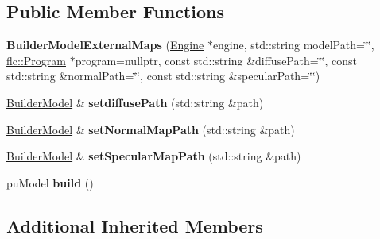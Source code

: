 \subsection*{Public Member Functions}
\begin{DoxyCompactItemize}
\item 
{\bfseries Builder\+Model\+External\+Maps} (\hyperlink{classflw_1_1Engine}{Engine} $\ast$engine, std\+::string model\+Path=\char`\"{}\char`\"{}, \hyperlink{classflw_1_1flc_1_1Program}{flc\+::\+Program} $\ast$program=nullptr, const std\+::string \&diffuse\+Path=\char`\"{}\char`\"{}, const std\+::string \&normal\+Path=\char`\"{}\char`\"{}, const std\+::string \&specular\+Path=\char`\"{}\char`\"{})\hypertarget{classflw_1_1flf_1_1BuilderModelExternalMaps_ac6426366eb916d358c29949fc50bdc87}{}\label{classflw_1_1flf_1_1BuilderModelExternalMaps_ac6426366eb916d358c29949fc50bdc87}

\item 
\hyperlink{classflw_1_1flf_1_1BuilderModel}{Builder\+Model} \& {\bfseries setdiffuse\+Path} (std\+::string \&path)\hypertarget{classflw_1_1flf_1_1BuilderModelExternalMaps_aca37eea934334c1148447fc6b90cc059}{}\label{classflw_1_1flf_1_1BuilderModelExternalMaps_aca37eea934334c1148447fc6b90cc059}

\item 
\hyperlink{classflw_1_1flf_1_1BuilderModel}{Builder\+Model} \& {\bfseries set\+Normal\+Map\+Path} (std\+::string \&path)\hypertarget{classflw_1_1flf_1_1BuilderModelExternalMaps_a7f2aaf60ece974f81a3457779c9285c9}{}\label{classflw_1_1flf_1_1BuilderModelExternalMaps_a7f2aaf60ece974f81a3457779c9285c9}

\item 
\hyperlink{classflw_1_1flf_1_1BuilderModel}{Builder\+Model} \& {\bfseries set\+Specular\+Map\+Path} (std\+::string \&path)\hypertarget{classflw_1_1flf_1_1BuilderModelExternalMaps_ae55c925549e30f8161c4e4dfea45a1c2}{}\label{classflw_1_1flf_1_1BuilderModelExternalMaps_ae55c925549e30f8161c4e4dfea45a1c2}

\item 
pu\+Model {\bfseries build} ()\hypertarget{classflw_1_1flf_1_1BuilderModelExternalMaps_a99bccf5d995445e7eb423571f9611e25}{}\label{classflw_1_1flf_1_1BuilderModelExternalMaps_a99bccf5d995445e7eb423571f9611e25}

\end{DoxyCompactItemize}
\subsection*{Additional Inherited Members}


